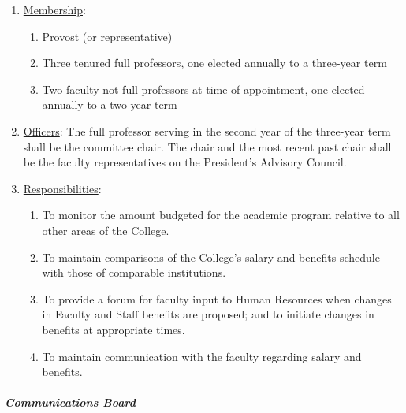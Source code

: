 					\begin{enumerate}[label=\alph*)]
						\item{\underline{Membership}: 
							\begin{enumerate}[label=\arabic*)]
								\item{Provost (or representative)}
								\item{Three tenured full professors, one elected annually to a three-year term}
								\item{Two faculty not full professors at time of appointment, one elected annually to a two-year term}
							\end{enumerate}
						}
						\item{\underline{Officers}:
							The full professor serving in the second year of the three-year term shall be the committee chair.  The chair and the most recent past chair shall be the faculty representatives on the President's Advisory Council.
						}
						\item{\underline{Responsibilities}:
							\begin{enumerate}[label=\arabic*)]
								\item{To monitor the amount budgeted for the academic program relative to all other areas of the College.}
								\item{To maintain comparisons of the College's salary and benefits schedule with those of comparable institutions.}
								\item{To provide a forum for faculty input to Human Resources when changes in Faculty and Staff benefits are proposed; and to initiate changes in benefits at appropriate times.}
								\item{To maintain communication with the faculty regarding salary and benefits.}
							\end{enumerate}
						}
					\end{enumerate}
				\subparagraph{Communications Board}
